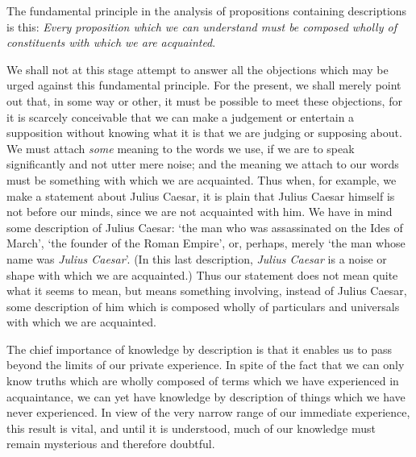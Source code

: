 \documentclass[oneside,letterpaper,12pt]{book}
\begin{document}
\label{fundamental} The fundamental principle in the analysis of propositions containing
descriptions is this: \emph{Every proposition which we can understand
must be composed wholly of constituents with which we are acquainted}.

We shall not at this stage attempt to answer all the objections which
may be urged against this fundamental principle. For the present, we
shall merely point out that, in some way or other, it must be possible
to meet these objections, for it is scarcely conceivable that we can
make a judgement or entertain a supposition without knowing what it is
that we are judging or supposing about. We must attach \emph{some}
meaning to the words we use, if we are to speak significantly and not
utter mere noise; and the meaning we attach to our words must be
something with which we are acquainted. Thus when, for example, we make
a statement about Julius Caesar, it is plain that Julius Caesar himself
is not before our minds, since we are not acquainted with him. We have
in mind some description of Julius Caesar: `the man who
was assassinated on the Ides of March',
`the founder of the Roman Empire', or,
perhaps, merely `the man whose name was \emph{Julius
Caesar}'. (In this last description, \emph{Julius Caesar}
is a noise or shape with which we are acquainted.) Thus our statement
does not mean quite what it seems to mean, but means something
involving, instead of Julius Caesar, some description of him which is
composed wholly of particulars and universals with which we are
acquainted.

The chief importance of knowledge by description is that it enables us
to pass beyond the limits of our private experience. In spite of the
fact that we can only know truths which are wholly composed of terms
which we have experienced in acquaintance, we can yet have knowledge by
description of things which we have never experienced. In view of the
very narrow range of our immediate experience, this result is vital, and
until it is understood, much of our knowledge must remain mysterious and
therefore doubtful.

\protect\hypertarget{link2HCH0006}{}{}
\pagebreak 
\end{document}
